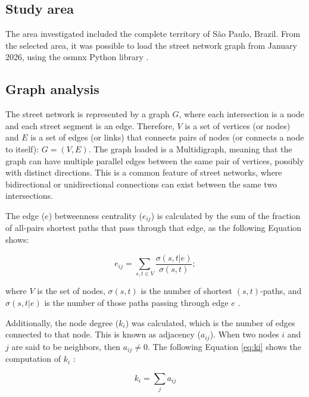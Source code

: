\documentclass{pssbmac}
\begin{document}
\subsection{Study area}

The area investigated included the complete territory of São Paulo, Brazil. From the selected area, it was possible to load the street network graph from January 2026, using the osmnx Python library \cite{boeingModelingAnalyzingUrban2025}.

\subsection{Graph analysis}

The street network is represented by a graph $G$, where each intersection is a node and each street segment is an edge. Therefore, $V$ is a set of vertices (or nodes) and $E$ is a set of edges (or links) that connects pairs of nodes (or connects a node to itself): $G = (V, E)$. The graph loaded is a Multidigraph, meaning that the graph can have multiple parallel edges between the same pair of vertices, possibly with distinct directions. This is a common feature of street networks, where bidirectional or unidirectional connections can exist between the same two intersections.

The edge ($e$) betweenness centrality ($e_{ij}$) is calculated by the sum of the fraction of all-pairs shortest paths that pass through that edge, as the following Equation shows:

\begin{equation}
e_{ij} = \sum_{s, t \in V} \frac{\sigma(s, t | e)}{\sigma(s, t)}; \label{eq:ebc}
\end{equation}

where $V$ is the set of nodes, $\sigma(s, t)$ is the number of shortest $(s, t)$-paths, and $\sigma(s, t | e)$ is the number of those paths passing through edge $e$ \cite{costaCharacterizationComplexNetworks2007}.

Additionally, the node degree ($k_i$) was calculated, which is the number of edges connected to that node. This is known as adjacency ($a_{i j}$). When two nodes $i$ and $j$ are said to be neighbors, then $a_{i j} \neq 0$. The following Equation \ref{eq:ki} shows the computation of $k_i$ \cite{costaCharacterizationComplexNetworks2007}:

\begin{equation}
k_i = \sum_j a_{i j} \label{eq:ki}
\end{equation}
\end{document}
